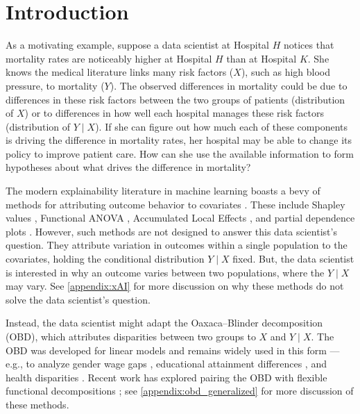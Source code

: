 \section{Introduction}
\label{sec:intro}
As a motivating example, suppose a data scientist at Hospital $H$ notices that mortality rates are noticeably higher at Hospital $H$ than at Hospital $K$.
She knows the medical literature links many risk factors ($X$), such as high blood pressure, to mortality ($Y$).
The observed differences in mortality could be due to differences in these risk factors between the two groups of patients (distribution of $X$) or to differences in how well each hospital manages these risk factors (distribution of $Y \mid X$).
If she can figure out how much each of these components is driving the difference in mortality rates, her hospital may be able to change its policy to improve patient care.
How can she use the available information to form hypotheses about what drives the difference in mortality?

The modern explainability literature in machine learning boasts a bevy of methods for attributing outcome behavior to covariates \citep{Dwivedi2023}.
These include Shapley values \citep{Shapley1953, Lundberg2017, chen2025shapley}, Functional ANOVA \citep{stone1994, hooker2004discovering, hookerGeneralizedFunctionalANOVA2007, lengerich2020purifying, fumagalli2025fanova}, Accumulated Local Effects \citep{apley2020}, and partial dependence plots \citep{friedman2001greedy, liu2025trees}.
However, such methods are not designed to answer this data scientist's question.
They attribute variation in outcomes within a single population to the covariates, holding the conditional distribution $Y \mid X$ fixed.
But, the data scientist is interested in why an outcome varies between two populations, where the $Y \mid X$ may vary.
See \cref{appendix:xAI} for more discussion on why these methods do not solve the data scientist's question.

Instead, the data scientist might adapt the Oaxaca--Blinder decomposition (OBD), which attributes disparities between two groups to $X$ and $Y \mid X$. 
The OBD was developed for linear models \citep{oaxaca1973,blinder1973} and remains widely used in this form --- e.g., to analyze gender wage gaps \citep{paradaContzen2025}, educational attainment differences \citep{barhaim2023}, and health disparities \citep{cartwright2021}. Recent work has explored pairing the OBD with flexible functional decompositions \citep{quintero2025,bach2024heterogeneity,quintas2024multiply,mao2025double,flachaire2025decomposing}; see \cref{appendix:obd_generalized} for more discussion of these methods.

